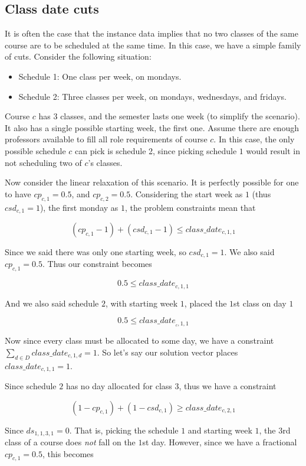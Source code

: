 \subsection{Class date cuts}

It is often the case that the instance data implies that no two classes of the same course are to be scheduled at the same time. In this case, we have a simple family of cuts. Consider the following situation:

\begin{itemize}
  \item Schedule 1: One class per week, on mondays.
  \item Schedule 2: Three classes per week, on mondays, wednesdays, and fridays.
\end{itemize}

Course $c$ has 3 classes, and the semester lasts one week (to simplify the scenario). It also has a single possible starting week, the first one. Assume there are enough professors available to fill all role requirements of course $c$. In this case, the only possible schedule $c$ can pick is schedule 2, since picking schedule $1$ would result in not scheduling two of $c$'s classes.

Now consider the linear relaxation of this scenario. It is perfectly possible for one to have $cp_{c, 1} = 0.5$, and $cp_{c, 2} = 0.5$. Considering the start week as $1$ (thus $csd_{c, 1} = 1$), the first monday as $1$, the problem constraints mean that

$$
(cp_{c, 1} - 1) + (csd_{c, 1} - 1) \le class\_date_{c, 1, 1}
$$

Since we said there was only one starting week, so $csd_{c, 1} = 1$. We also said $cp_{c, 1} = 0.5$. Thus our constraint becomes

$$
0.5 \le class\_date_{c, 1, 1}
$$

And we also said schedule $2$, with starting week $1$,  placed the $1$st class on day $1$

$$
0.5 \le class\_date_{_c, 1, 1}
$$

Now since every class must be allocated to some day, we have a constraint $\sum_{d \in D} class\_date_{c, 1, d} = 1$. So let's say our solution vector places $class\_date_{c, 1, 1} = 1$.

Since schedule $2$ has no day allocated for class $3$, thus we have a constraint

$$
(1 - cp_{c, 1}) + (1 - csd_{c, 1}) \ge class\_date_{c, 2, 1}
$$

Since $ds_{1, 1, 3, 1} = 0$. That is, picking the schedule $1$ and starting week $1$, the $3$rd class of a course does \emph{not} fall on the $1$st day. However, since we have a fractional $cp_{c, 1} = 0.5$, this becomes

